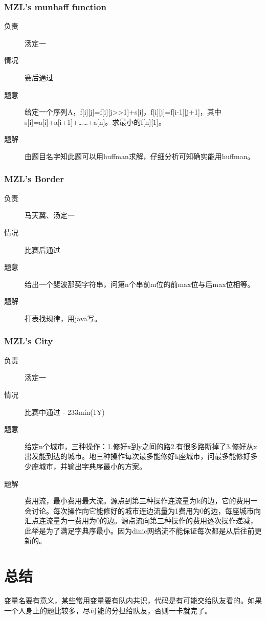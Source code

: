 \documentclass[a4paper, 11pt, nofonts, nocap, fancyhdr]{ctexart}
\newcommand{\problem}[1]{\subsubsection{#1}}
\begin{document}
\problem{MZL's munhaff function}

\begin{description}
\item[负责] 汤定一
\item[情况] 赛后通过
\item[题意]
给定一个序列A，f[i][j]=f[i][j>>1]+s[i]，f[i][j]=f[i-1][j+1]，其中s[i]=a[i]+a[i+1]+……+a[n]。求最小的f[n][1]。
\item[题解]
由题目名字知此题可以用huffman求解，仔细分析可知确实能用huffman。
\end{description}

\problem{MZL's Border}

\begin{description}
\item[负责] 马天翼、汤定一
\item[情况] 比赛后通过
\item[题意]
给出一个斐波那契字符串，问第n个串前m位的前max位与后max位相等。
\item[题解]
打表找规律，用java写。
\end{description}

\problem{MZL's City}

\begin{description}
\item[负责] 汤定一
\item[情况] 比赛中通过 - 233min(1Y)
\item[题意]
给定n个城市，三种操作：1.修好x到y之间的路2.有很多路断掉了3.修好从x出发能到达的城市。地三种操作每次最多能修好k座城市，问最多能修好多少座城市，并输出字典序最小的方案。
\item[题解]
费用流，最小费用最大流。源点到第三种操作连流量为k的边，它的费用一会讨论。每次操作向它能修好的城市连边流量为1费用为0的边，每座城市向汇点连流量为一费用为0的边。源点流向第三种操作的费用逐次操作递减，此举是为了满足字典序最小。因为dinic网络流不能保证每次都是从后往前更新的。
\end{description}

\section{总结}

变量名要有意义，某些常用变量要有队内共识，代码是有可能交给队友看的。如果一个人身上的题比较多，尽可能的分担给队友，否则一卡就完了。
\end{document}
